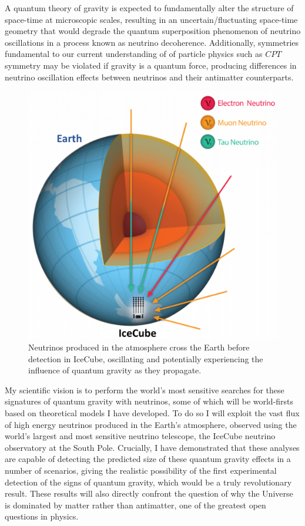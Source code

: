 \documentclass[a4paper,11pt]{article}
\begin{document}
A quantum theory of gravity is expected to fundamentally alter the structure of space-time at microscopic scales, resulting in an uncertain/fluctuating space-time geometry that would degrade the quantum superposition phenomenon of neutrino oscillations in a process known as neutrino decoherence. Additionally, symmetries fundamental to our current understanding of of particle physics such as $CPT$ symmetry may be violated if gravity is a quantum force, producing differences in neutrino oscillation effects between neutrinos and their antimatter counterparts. 

\begin{figure} %
    \centering
		\includegraphics[width=1.\linewidth]{images/atmo_osc.png}
		\caption{Neutrinos produced in the atmosphere cross the Earth before detection in IceCube, oscillating and potentially experiencing the influence of quantum gravity as they propagate.}
		\vspace{-7pt}
		\label{fig:atmo_osc}
\end{figure}

My scientific vision is to perform the world's most sensitive searches for these signatures of quantum gravity with neutrinos, some of which will be world-firsts based on theoretical models I have developed. To do so I will exploit the vast flux of high energy neutrinos produced in the Earth's atmosphere, observed using the world's largest and most sensitive neutrino telescope, the IceCube neutrino observatory at the South Pole. Crucially, I have demonstrated that these analyses are capable of detecting the predicted size of these quantum gravity effects in a number of scenarios, giving the realistic possibility of the first experimental detection of the signs of quantum gravity, which would be a truly revolutionary result. These results will also directly confront the question of why the Universe is dominated by matter rather than antimatter, one of the greatest open questions in physics.
\end{document}
